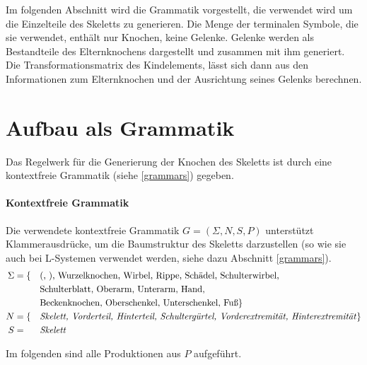 Im folgenden Abschnitt wird die Grammatik vorgestellt, die verwendet wird um die Einzelteile des Skeletts zu generieren. Die Menge der terminalen Symbole, die sie verwendet, enthält nur Knochen, keine Gelenke. Gelenke werden als Bestandteile des Elternknochens dargestellt und zusammen mit ihm generiert. Die Transformationsmatrix des Kindelements, lässt sich dann aus den Informationen zum Elternknochen und der Ausrichtung seines Gelenks berechnen.


\section{Aufbau als Grammatik}
\label{section:grammar}

Das Regelwerk für die Generierung der Knochen des Skeletts ist durch eine kontextfreie Grammatik (siehe \ref{grammars}) gegeben.

\paragraph{Kontextfreie Grammatik}
Die verwendete kontextfreie Grammatik $G = (\Sigma, N, S, P)$ unterstützt Klammerausdrücke, um die Baumstruktur des Skeletts darzustellen (so wie sie auch bei L-Systemen verwendet werden, siehe dazu Abschnitt \ref{grammars}).
\begin{alignat*}{2}
 \Sigma & = \{&&\text{(, ), Wurzelknochen, Wirbel, Rippe, Schädel, Schulterwirbel,}\\  
        & &&\text{Schulterblatt, Oberarm, Unterarm, Hand,}\\ 
        & &&\text{Beckenknochen, Oberschenkel, Unterschenkel, Fuß}\}\\
 N &= \{&&\text{\emph{Skelett, Vorderteil, Hinterteil, Schultergürtel, Vorderextremität, Hinterextremität}}\}\\
 S &= &&\text{\emph{Skelett}}
\end{alignat*}

Im folgenden sind alle Produktionen aus $P$ aufgeführt.

